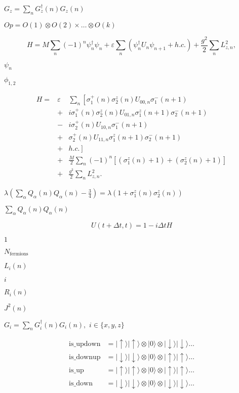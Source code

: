 \documentclass{article}
\begin{document}
{$ G_z=\sum_nG^\dagger_z(n)G_z(n)$
\pagebreak

$ Op=O(1)\otimes O(2) \times \dots \otimes O(k) $
\pagebreak

\[ H = M\sum_n (-1)^n\psi_n^\dagger\psi_n +  \varepsilon\sum_n \left(\psi_n^\dagger U_{n}\psi_{n+1}+h.c.\right)+\frac{g^2}{2}\sum_n L_{z,n}^2,\]
\pagebreak

$ \psi_n $
\pagebreak

$ \phi_{1,2}$
\pagebreak

\begin{eqnarray*}
H = &\varepsilon &\sum_n\left[\sigma^+_1(n)\sigma^z_2(n) U_{00,n}\sigma_{1}^-(n+1)\right.\\
   &+& i\sigma^+_1(n)\sigma^z_2(n) U_{01,n}\sigma_{1}^z(n+1)\sigma_{2}^-(n+1)\\
   &-&i \sigma^+_2(n) U_{10,n}\sigma_{1}^-(n+1)\\
   &+& \sigma^+_2(n) U_{11,n}\sigma_{1}^z(n+1)\sigma_{2}^-(n+1)\\
   &+& \left.h.c.\right]\\
   &+&\frac{M}{2}\sum_n(-1)^n\left[ (\sigma^z_{1}(n)+1)+(\sigma^z_{2}(n)+1)\right] \\
   &+&\frac{g^2}{2} \sum_n L_{z,n}^2.
\end{eqnarray*}
\pagebreak

$ \lambda\left(\sum_\alpha Q_\alpha(n) Q_\alpha(n) - \frac{3}{4}\right) = \lambda\left(1+\sigma^z_{1}(n)\sigma^z_{2}(n)\right) $
\pagebreak

$ \sum_\alpha Q_\alpha(n) Q_\alpha(n) $
\pagebreak

\[U(t+\Delta t,t)=1-i\Delta t H\]
\pagebreak

$ 1 $
\pagebreak

$ N_\mathrm{fermions}$
\pagebreak

$ L_i(n)$
\pagebreak

$ i $
\pagebreak

$ R_i(n)$
\pagebreak

$ J^2(n)$
\pagebreak

$ G_i=\sum_nG^\dagger_i(n)G_i(n),\,\, i\in\{x,y,z\}$
\pagebreak

\begin{eqnarray*}
\mathrm{is\_updown} &= |\uparrow\rangle |\uparrow\rangle \otimes |0\rangle\otimes |\downarrow\rangle|\downarrow\rangle\dots\\ 
\mathrm{is\_downup} &= |\downarrow\rangle|\downarrow\rangle\otimes |0\rangle\otimes|\uparrow\rangle |\uparrow\rangle \dots\\
\mathrm{is\_up} &= |\uparrow\rangle|\uparrow\rangle\otimes |0\rangle\otimes|\uparrow\rangle |\uparrow\rangle \dots\\
\mathrm{is\_down} &= |\downarrow\rangle|\downarrow\rangle\otimes |0\rangle\otimes|\downarrow\rangle |\downarrow\rangle \dots\\
\end{eqnarray*}
\pagebreak

}
\end{document}
